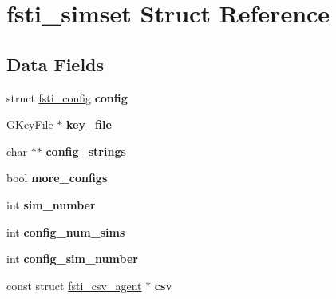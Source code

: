 \hypertarget{structfsti__simset}{}\section{fsti\+\_\+simset Struct Reference}
\label{structfsti__simset}
\subsection*{Data Fields}
\begin{DoxyCompactItemize}
\item 
\mbox{\label{structfsti__simset_add8d85ac062f5eff4ad3342c4a9cae75}} 
struct \mbox{\hyperlink{structfsti__config}{fsti\+\_\+config}} {\bfseries config}
\item 
\mbox{\label{structfsti__simset_a8375a8f4e415c4a93ad7c00c9bea3f11}} 
G\+Key\+File $\ast$ {\bfseries key\+\_\+file}
\item 
\mbox{\label{structfsti__simset_a7610ad16eda85f1951f06e9543701f41}} 
char $\ast$$\ast$ {\bfseries config\+\_\+strings}
\item 
\mbox{\label{structfsti__simset_a19c6162acc10b9986c30363287088295}} 
bool {\bfseries more\+\_\+configs}
\item 
\mbox{\label{structfsti__simset_ac00dba7fb65ecba47a36ef06074dd36a}} 
int {\bfseries sim\+\_\+number}
\item 
\mbox{\label{structfsti__simset_afc51713c1ac07b9a3ba0cecaf780b909}} 
int {\bfseries config\+\_\+num\+\_\+sims}
\item 
\mbox{\label{structfsti__simset_a0798e1d03a30f50a05a1f70c2fd5c3bb}} 
int {\bfseries config\+\_\+sim\+\_\+number}
\item 
\mbox{\label{structfsti__simset_aeb197e0d40c9abe228e68794bb16c788}} 
const struct \mbox{\hyperlink{structfsti__csv__agent}{fsti\+\_\+csv\+\_\+agent}} $\ast$ {\bfseries csv}
\item 
\mbox{\label{structfsti__simset_a9cfabd7df79f967edc1fbc4cb0167340}} 
$$
\end{DoxyCompactItemize}
